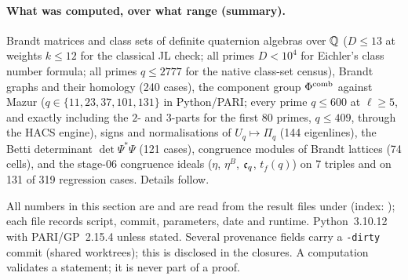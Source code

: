 \paragraph{What was computed, over what range (summary).} Brandt matrices and class sets of definite quaternion algebras
over $\mathbb{Q}$ ($D\le 13$ at weights $k\le12$ for the classical JL check; all primes $D<10^4$ for Eichler's class number formula;
all primes $q\le2777$ for the native class-set census), Brandt graphs and their homology (240 cases), the component group
$\Phi^{\mathrm{comb}}$ against Mazur ($q\in\{11,23,37,101,131\}$ in Python/PARI; every prime $q\le600$ at $\ell\ge5$, and exactly including
the $2$- and $3$-parts for the first 80 primes, $q\le409$, through the HACS engine), signs and normalisations of $U_q\mapsto\Pi_q$
(144 eigenlines), the Betti determinant $\det\Psi^*\Psi$ (121 cases), congruence modules of Brandt lattices (74 cells), and the
stage-06 congruence ideals ($\eta$, $\eta^B$, $\mathfrak{c}_q$, $t_f(q)$) on 7 triples and on 131 of 319 regression cases. Details follow.

All numbers in this section are \stcomp{} and are read from the result files under  (index:
); each file records script, commit, parameters, date and runtime. Python~3.10.12 with
PARI/GP~2.15.4 unless stated. Several provenance fields carry a \texttt{-dirty} commit (shared worktrees); this is disclosed
in the closures. A computation validates a statement; it is never part of a proof.

